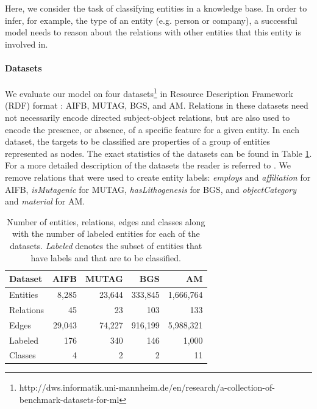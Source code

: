 Here, we consider the task of classifying entities in a knowledge base. In order to infer, for example, the type of an entity (e.g. person or company), a successful model needs to reason about the relations with other entities that this entity is involved in.

\paragraph{Datasets}
We evaluate our model on four datasets\footnote{http://dws.informatik.uni-mannheim.de/en/research/a-collection-of-benchmark-datasets-for-ml} in Resource Description Framework (RDF) format \cite{ristoski2016collection}: AIFB, MUTAG, BGS, and AM. Relations in these datasets need not necessarily encode directed subject-object relations, but are also used to encode the presence, or absence, of a specific feature for a given entity. In each dataset, the targets to be classified are properties of a group of entities represented as nodes. The exact statistics of the datasets can be found in Table \ref{table:classification_datasets}. For a more detailed description of the datasets the reader is referred to \citet{ristoski2016collection}. We remove relations that were used to create entity labels: \textit{employs} and \textit{affiliation} for AIFB, \textit{isMutagenic} for MUTAG, \textit{hasLithogenesis} for BGS, and \textit{objectCategory} and \textit{material} for AM.

\begin{table}[htp!]
\centering
\begin{tabular}{lrrrr}
\toprule
Dataset & AIFB & MUTAG & BGS & AM  \\ \midrule
Entities    & 8,285 & 23,644 & 333,845 & 1,666,764 \\
Relations   & 45 & 23 & 103 & 133 \\
Edges   & 29,043 & 74,227 & 916,199& 5,988,321 \\
Labeled  & 176 & 340 & 146 &  1,000 \\
Classes  & 4 & 2 & 2 &  11 \\

 \bottomrule
\end{tabular}
\caption{Number of entities, relations, edges and classes along with the number of labeled entities for each of the datasets. \textit{Labeled} denotes the subset of entities that have labels and that are to be classified.}
\label{table:classification_datasets}
\end{table}


